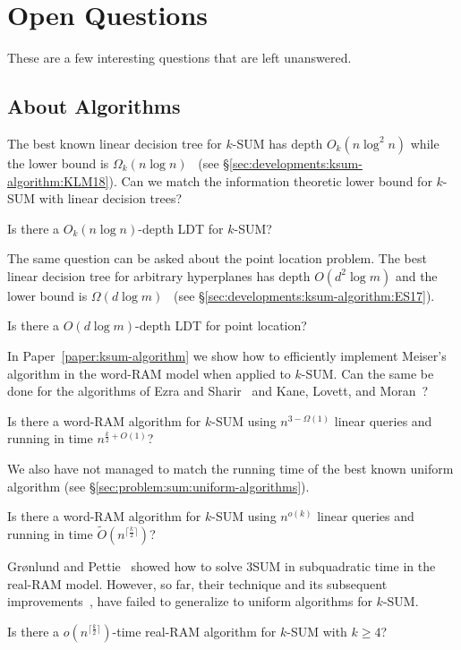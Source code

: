 \chapter{\done Open Questions}

These are a few interesting questions that are left unanswered.

\section{About Algorithms}

The best known linear decision tree for \(k\)-SUM has depth \(O_k(n \log^2 n)\) while
the lower bound is \(\Omega_k(n \log n)\)~\cite{KLM18}
(see \S\ref{sec:developments:ksum-algorithm:KLM18}).
Can we match the information theoretic lower bound for \(k\)-SUM with linear
decision trees?
\begin{openquestion}
Is there a \(O_k(n \log n)\)-depth LDT for \(k\)-SUM?
\end{openquestion}

The same question can be asked about the point location problem. The best
linear decision tree for arbitrary hyperplanes has depth \(O(d^2 \log m)\)
and the lower bound is \(\Omega(d \log m)\)~\cite{ES17}
(see \S\ref{sec:developments:ksum-algorithm:ES17}).
\begin{openquestion}
Is there a \(O(d \log m)\)-depth LDT for point location?
\end{openquestion}

In Paper~\ref{paper:ksum-algorithm}
we show how to efficiently implement Meiser's algorithm in the word-RAM model
when applied to \(k\)-SUM. Can the same be done for the algorithms of Ezra and
Sharir~\cite{ES17} and Kane, Lovett, and Moran~\cite{KLM18}?
\begin{openquestion}
Is there a word-RAM algorithm for \(k\)-SUM using \(n^{3 - \Omega(1)}\)
linear queries and running in time \(n^{\frac{k}{2}+O(1)}\)?
\end{openquestion}

We also have not managed to match the running time of the best known uniform
algorithm (see \S\ref{sec:problem:sum:uniform-algorithms}).
\begin{openquestion}
Is there a word-RAM algorithm for \(k\)-SUM using \(n^{o(k)}\) linear queries and
running in time \( \tilde{O}(n^{\lceil \frac k2 \rceil})\)?
\end{openquestion}

Gr\o nlund and Pettie~\cite{GP18}
showed how to solve 3SUM in subquadratic time in the real-RAM model.
However, so far, their technique and its subsequent
improvements~\cite{Fr15,GS15,Ch18}, have failed to generalize to uniform algorithms
for \(k\)-SUM.
\begin{openquestion}
	Is there a \(o(n^{\lceil \frac k2 \rceil})\)-time real-RAM algorithm for
	\(k\)-SUM with \(k \geq 4\)?
\end{openquestion}

